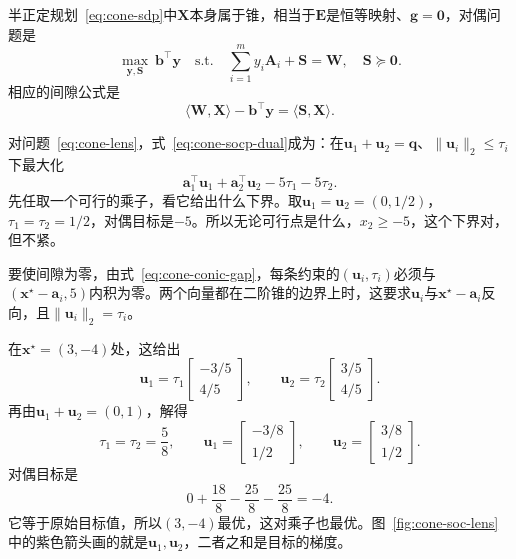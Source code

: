 半正定规划~\eqref{eq:cone-sdp}中$\bm{X}$本身属于锥，相当于$\bm{E}$是恒等映射、$\bm{g}=\bm{0}$，对偶问题是
\begin{equation}
 \max_{\bm{y},\bm{S}}\ \bm{b}^\top\bm{y}\quad\text{s.t.}\quad\sum_{i=1}^my_i\bm{A}_i+\bm{S}=\bm{W},\quad\bm{S}\succeq\bm{0}.
 \label{eq:cone-sdp-dual}
\end{equation}
相应的间隙公式是
\begin{equation}
 \langle\bm{W},\bm{X}\rangle-\bm{b}^\top\bm{y}=\langle\bm{S},\bm{X}\rangle.
 \label{eq:cone-sdp-gap}
\end{equation}

\begin{example}[透镜问题的对偶证书]
\label{ex:cone-lens-dual}
对问题~\eqref{eq:cone-lens}，式~\eqref{eq:cone-socp-dual}成为：在$\bm{u}_1+\bm{u}_2=\bm{q}$、$\lVert\bm{u}_i\rVert_2\leq\tau_i$下最大化
\[
 \bm{a}_1^\top\bm{u}_1+\bm{a}_2^\top\bm{u}_2-5\tau_1-5\tau_2.
\]
先任取一个可行的乘子，看它给出什么下界。取$\bm{u}_1=\bm{u}_2=(0,1/2)$，$\tau_1=\tau_2=1/2$，对偶目标是$-5$。所以无论可行点是什么，$x_2\geq-5$，这个下界对，但不紧。

要使间隙为零，由式~\eqref{eq:cone-conic-gap}，每条约束的$(\bm{u}_i,\tau_i)$必须与$(\bm{x}^\star-\bm{a}_i,5)$内积为零。两个向量都在二阶锥的边界上时，这要求$\bm{u}_i$与$\bm{x}^\star-\bm{a}_i$反向，且$\lVert\bm{u}_i\rVert_2=\tau_i$。

在$\bm{x}^\star=(3,-4)$处，这给出
\[
 \bm{u}_1=\tau_1\begin{bmatrix}-3/5\\4/5\end{bmatrix},\qquad
 \bm{u}_2=\tau_2\begin{bmatrix}3/5\\4/5\end{bmatrix}.
\]
再由$\bm{u}_1+\bm{u}_2=(0,1)$，解得
\[
 \tau_1=\tau_2=\frac58,\qquad
 \bm{u}_1=\begin{bmatrix}-3/8\\1/2\end{bmatrix},\qquad
 \bm{u}_2=\begin{bmatrix}3/8\\1/2\end{bmatrix}.
\]
对偶目标是
\[
 0+\frac{18}{8}-\frac{25}{8}-\frac{25}{8}=-4.
\]
它等于原始目标值，所以$(3,-4)$最优，这对乘子也最优。图~\ref{fig:cone-soc-lens}中的紫色箭头画的就是$\bm{u}_1,\bm{u}_2$，二者之和是目标的梯度。
\end{example}

